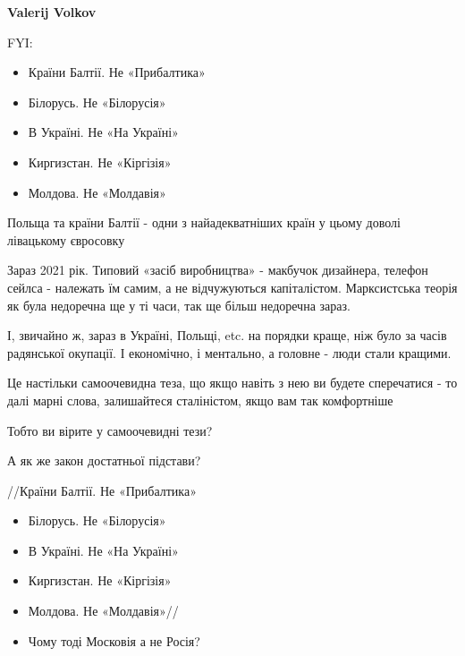 \begin{itemize}
\begin{itemize}
\textbf{Valerij Volkov}

FYI:

\begin{itemize}
  \item Країни Балтії. Не «Прибалтика»
  \item Білорусь. Не «Білорусія»
  \item В Україні. Не «На Україні»
  \item Киргизстан. Не «Кіргізія»
  \item Молдова. Не «Молдавія»
\end{itemize}

Польща та країни Балтії - одни з найадекватніших країн у цьому доволі
лівацькому євросовку

Зараз 2021 рік. Типовий «засіб виробництва» - макбучок дизайнера, телефон
сейлса - належать їм самим, а не відчужуються капіталістом. Марксистська теорія
як була недоречна ще у ті часи, так ще більш недоречна зараз.

І, звичайно ж, зараз в Україні, Польщі, etc. на порядки краще, ніж було за
часів радянської окупації. І економічно, і ментально, а головне - люди стали
кращими.

Це настільки самоочевидна теза, що якщо навіть з нею ви будете сперечатися - то
далі марні слова, залишайтеся сталіністом, якщо вам так комфортніше


 

Тобто ви вірите у самоочевидні тези?

А як же закон достатньої підстави?

 
//Країни Балтії. Не «Прибалтика»

\begin{itemize}
  \item Білорусь. Не «Білорусія»
  \item В Україні. Не «На Україні»
  \item Киргизстан. Не «Кіргізія»
  \item Молдова. Не «Молдавія»//
  \item Чому тоді Московія а не Росія?
\end{itemize}


\end{itemize}
\end{itemize}
